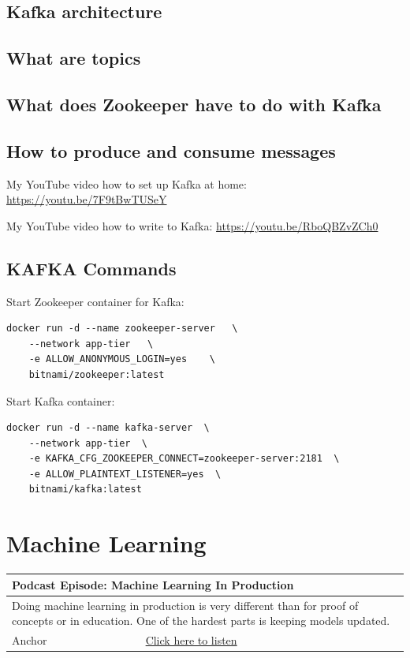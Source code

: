 \documentclass[12pt, numbers=noenddot]{scrreprt} %
\begin{document}
\section{Kafka architecture}
\section{What are topics}
\section{What does Zookeeper have to do with Kafka}
\section{How to produce and consume messages}

My YouTube video how to set up Kafka at home: \url{https://youtu.be/7F9tBwTUSeY}

My YouTube video how to write to Kafka: \url{https://youtu.be/RboQBZvZCh0}

\section{KAFKA Commands}

Start Zookeeper container for Kafka:

\begin{lstlisting}
docker run -d --name zookeeper-server   \
	--network app-tier   \
	-e ALLOW_ANONYMOUS_LOGIN=yes    \
	bitnami/zookeeper:latest
\end{lstlisting}

Start Kafka container:

\begin{lstlisting}
docker run -d --name kafka-server  \
	--network app-tier  \
	-e KAFKA_CFG_ZOOKEEPER_CONNECT=zookeeper-server:2181  \
	-e ALLOW_PLAINTEXT_LISTENER=yes  \
	bitnami/kafka:latest
\end{lstlisting}


\chapter{Machine Learning}

\begin{table}[h]
\begin{tabular}{ll}
\hline
\multicolumn{2}{l}{\textbf{Podcast Episode:} Machine Learning In Production} \\ \hline
\multicolumn{2}{p{15cm}}{Doing machine learning in production is very different than for proof of concepts or in education. One of the hardest parts is keeping models updated.}         \\ \hline
\multicolumn{1}{l|}{Anchor}   & \href{https://anchor.fm/andreaskayy/episodes/Machine-Learning-In-Production-e11bbk}{Click here to listen}   \\  \hline
\end{tabular}
\end{table}
\end{document}
